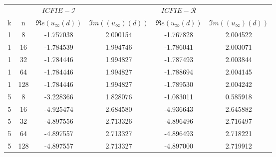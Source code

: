 \begin{tabular}{|cc|cc|cc|}\hline 
 & & $ICFIE-\mathcal{I}$& &$ICFIE-\mathcal{R}$ & \\k &  n & $\Re{e}\left(u_\infty(d)\right)$ & $\Im{m}\left((u_\infty)(d)\right)$ & $\Re{e}\left(u_\infty(d)\right)$ & $\Im{m}\left((u_\infty)(d)\right)$ \\ \hline 
1 & 8 & -1.757038 & 2.000154 & -1.767828 & 2.004522 \\ 
\hline 
1 & 16 & -1.784539 & 1.994746 & -1.786041 & 2.003071 \\ 
\hline 
1 & 32 & -1.784446 & 1.994827 & -1.787493 & 2.003844 \\ 
\hline 
1 & 64 & -1.784446 & 1.994827 & -1.788694 & 2.004145 \\ 
\hline 
1 & 128 & -1.784446 & 1.994827 & -1.789530 & 2.004242 \\ 
\hline 
5 & 8 & -3.228366 & 1.828076 & -1.083011 & 0.585918 \\ 
\hline 
5 & 16 & -4.925474 & 2.684580 & -4.936643 & 2.645882 \\ 
\hline 
5 & 32 & -4.897556 & 2.713326 & -4.896496 & 2.716497 \\ 
\hline 
5 & 64 & -4.897557 & 2.713327 & -4.896493 & 2.718221 \\ 
\hline 
5 & 128 & -4.897557 & 2.713327 & -4.897000 & 2.719912 \\ 
\hline 
\end{tabular}
